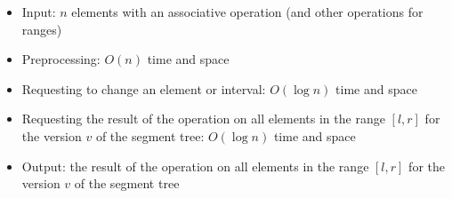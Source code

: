 \begin{itemize}
	\item Input: $n$ elements with an associative operation (and other operations for ranges)
	\item Preprocessing: $O(n)$ time and space
	\item Requesting to change an element or interval: $O(\log{n})$ time and space
	\item Requesting the result of the operation on all elements in the range $[l,r]$ for the version $v$ of the segment tree: $O(\log{n})$ time and space
	\item Output: the result of the operation on all elements in the range $[l,r]$ for the version $v$ of the segment tree
\end{itemize}